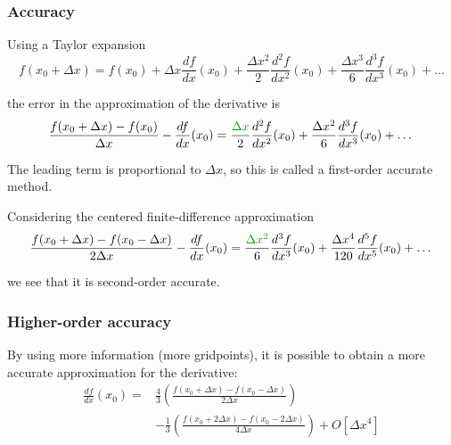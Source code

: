 \documentclass[aspectratio=149,9pt]{beamer}
\begin{document}
\begin{frame}
	\frametitle{Accuracy}
    \vspace*{-1ex}
	Using a Taylor expansion\vspace*{1ex}
	\begin{equation*}
		f(x_0+\Delta x) = f(x_0) +
		\Delta x \frac{df}{dx} (x_0)
		+ \frac{\Delta x^2}{2} \frac{d^2f}{dx^2} (x_0)
		+ \frac{\Delta x^3}{6} \frac{d^3 f}{dx^3} (x_0) + \dots
	\end{equation*}\par\vspace*{2ex}
	the error in the approximation of the derivative is\vspace*{1ex}
	\begin{equation*}
		\frac{f(x_0+\Delta x) - f(x_0)}{\Delta x}
		- \frac{d f}{dx} (x_0) =
		\frac{\textcolor{green!60!black}{\Delta x}}{2} \frac{d^2 f}{dx^2} (x_0)
		+ \frac{\Delta x^2}{6} \frac{d^3 f}{dx^3} (x_0) + \dots
	\end{equation*}\par\vspace*{2ex}
	The leading term is proportional to $\Delta x$, so this is called a first-order accurate method.\vspace*{2ex}
\pause
	\par
	Considering the centered finite-difference approximation
	\begin{equation*}
		\frac{f(x_0+\Delta x) - f(x_0 - \Delta x)}{2 \Delta x}
		- \frac{d f}{dx} (x_0) =
		\frac{\textcolor{green!60!black}{\Delta x^2}}{6} \frac{d^3 f}{dx^3} (x_0) +
		\frac{\Delta x^4}{120} \frac{d^5 f}{dx^5} (x_0) + \dots
	\end{equation*}\par\vspace*{1ex}
	we see that it is second-order accurate.
\end{frame}
%
%
\begin{frame}
	\frametitle{Higher-order accuracy}
	By using more information (more gridpoints), it is possible to obtain a more accurate approximation for the derivative:\vspace*{3ex}
	\begin{align*}
		\frac{df}{dx} (x_0) = &
		\frac43 \left(
			\frac{f(x_0 + \Delta x) - f(x_0 - \Delta x)}{2 \Delta x}
		\right)\\
		&-\frac13 \left(
			\frac{f(x_0 + 2\Delta x) - f(x_0 - 2 \Delta x)}{4 \Delta x}
		\right)
		+ O[\Delta x^4 ]
	\end{align*}
\end{frame}
\end{document}
